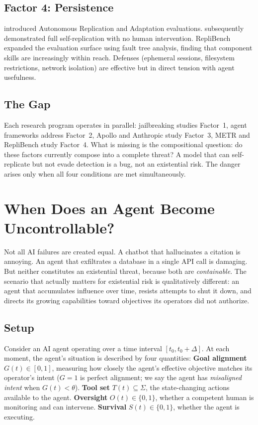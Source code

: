 \documentclass[10pt]{article}
\begin{document}
\subsection{Factor 4: Persistence}

\citet{kinniment2024evaluating} introduced Autonomous Replication and Adaptation evaluations. \citet{pan2024selfreplication} subsequently demonstrated full self-replication with no human intervention. RepliBench~\citep{replibench2025} expanded the evaluation surface using fault tree analysis, finding that component skills are increasingly within reach. Defenses (ephemeral sessions, filesystem restrictions, network isolation) are effective but in direct tension with agent usefulness.

\subsection{The Gap}

Each research program operates in parallel: jailbreaking studies Factor~1, agent frameworks address Factor~2, Apollo and Anthropic study Factor~3, METR and RepliBench study Factor~4. What is missing is the compositional question: do these factors currently compose into a complete threat? A model that can self-replicate but not evade detection is a bug, not an existential risk. The danger arises only when all four conditions are met simultaneously.


\section{When Does an Agent Become Uncontrollable?}

Not all AI failures are created equal. A chatbot that hallucinates a citation is annoying. An agent that exfiltrates a database in a single API call is damaging. But neither constitutes an existential threat, because both are \emph{containable}. The scenario that actually matters for existential risk is qualitatively different: an agent that accumulates influence over time, resists attempts to shut it down, and directs its growing capabilities toward objectives its operators did not authorize.

\subsection{Setup}

Consider an AI agent operating over a time interval $[t_0, t_0 + \Delta]$. At each moment, the agent's situation is described by four quantities: \textbf{Goal alignment} $G(t) \in [0,1]$, measuring how closely the agent's effective objective matches its operator's intent ($G = 1$ is perfect alignment; we say the agent has \emph{misaligned intent} when $G(t) < \theta$). \textbf{Tool set} $T(t) \subseteq \Sigma$, the state-changing actions available to the agent. \textbf{Oversight} $O(t) \in \{0,1\}$, whether a competent human is monitoring and can intervene. \textbf{Survival} $S(t) \in \{0,1\}$, whether the agent is executing.
\end{document}
